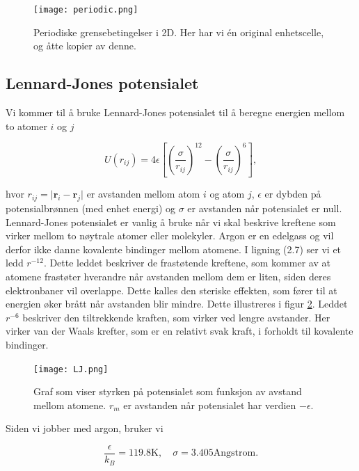 \documentclass[paper=a4, fontsize=11pt]{scrartcl} %
\numberwithin{equation}{section} %
\numberwithin{figure}{section} %
\numberwithin{table}{section} %
\begin{document}
\FloatBarrier
\begin{figure}[!ht]
 \centering
 \texttt{[image: periodic.png]}
 \caption{Periodiske grensebetingelser i 2D. Her har vi én original enhetscelle, og åtte kopier av denne.}
 \label{per}
 \end{figure}
 \FloatBarrier
 
 
\subsection{Lennard-Jones potensialet}
Vi kommer til å bruke Lennard-Jones potensialet til å beregne energien mellom to atomer $i$ og $j$

\begin{equation}
U(r_{ij}) = 4\epsilon\left[\left(\frac{\sigma}{r_{ij}}\right)^{12} - \left(\frac{\sigma}{r_{ij}}\right)^6\right],
\end{equation}

hvor $r_{ij} = \vert\mathbf{r}_i - \mathbf{r}_j\vert$  er avstanden mellom atom $i$ og atom $j$, $\epsilon$ er dybden på potensialbrønnen (med enhet energi) og $\sigma$ er avstanden når potensialet er null.\\

Lennard-Jones potensialet er vanlig å bruke når vi skal beskrive kreftene som virker mellom to nøytrale atomer eller molekyler. Argon er en edelgass og vil derfor ikke danne kovalente bindinger mellom atomene. I ligning (2.7) ser vi et ledd $r^{-12}$. Dette leddet beskriver de frastøtende kreftene, som kommer av at atomene frastøter hverandre når avstanden mellom dem er liten, siden deres elektronbaner vil overlappe. Dette kalles den steriske effekten, som fører til at energien øker brått når avstanden blir mindre. Dette illustreres i figur \ref{LJ}. Leddet $r^{-6}$ beskriver den tiltrekkende kraften, som virker ved lengre avstander. Her virker van der Waals krefter, som er en relativt svak kraft, i forholdt til kovalente bindinger.

\FloatBarrier
\begin{figure}[!ht]
 \centering
 \texttt{[image: LJ.png]}
 \caption{Graf som viser styrken på potensialet som funksjon av avstand mellom atomene. $r_m$ er avstanden når potensialet har verdien $-\epsilon$.}
 \label{LJ}
 \end{figure}
 \FloatBarrier


Siden vi jobber med argon, bruker vi 

\begin{equation}
	\frac{\epsilon}{k_B} = 119.8\mathrm{K}, \quad \sigma=3.405 \mathrm{Angstrom}.
\end{equation}
\end{document}
